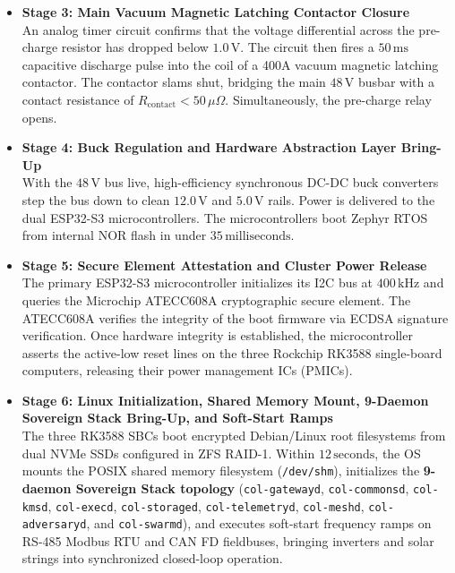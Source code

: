 \begin{itemize}
    \item \textbf{Stage 3: Main Vacuum Magnetic Latching Contactor Closure} \\
    An analog timer circuit confirms that the voltage differential across the pre-charge resistor has dropped below $1.0\,\mathrm{V}$. The circuit then fires a $50\,\mathrm{ms}$ capacitive discharge pulse into the coil of a 400A vacuum magnetic latching contactor. The contactor slams shut, bridging the main $48\,\mathrm{V}$ busbar with a contact resistance of $R_{\mathrm{contact}} < 50\,\mu\Omega$. Simultaneously, the pre-charge relay opens.
    
    \item \textbf{Stage 4: Buck Regulation and Hardware Abstraction Layer Bring-Up} \\
    With the $48\,\mathrm{V}$ bus live, high-efficiency synchronous DC-DC buck converters step the bus down to clean $12.0\,\mathrm{V}$ and $5.0\,\mathrm{V}$ rails. Power is delivered to the dual ESP32-S3 microcontrollers. The microcontrollers boot Zephyr RTOS from internal NOR flash in under $35\,\mathrm{milliseconds}$.
    
    \item \textbf{Stage 5: Secure Element Attestation and Cluster Power Release} \\
    The primary ESP32-S3 microcontroller initializes its I2C bus at $400\,\mathrm{kHz}$ and queries the Microchip ATECC608A cryptographic secure element. The ATECC608A verifies the integrity of the boot firmware via ECDSA signature verification. Once hardware integrity is established, the microcontroller asserts the active-low reset lines on the three Rockchip RK3588 single-board computers, releasing their power management ICs (PMICs).
    
    \item \textbf{Stage 6: Linux Initialization, Shared Memory Mount, 9-Daemon Sovereign Stack Bring-Up, and Soft-Start Ramps} \\
    The three RK3588 SBCs boot encrypted Debian/Linux root filesystems from dual NVMe SSDs configured in ZFS RAID-1. Within $12\,\mathrm{seconds}$, the OS mounts the POSIX shared memory filesystem (\texttt{/dev/shm}), initializes the \textbf{9-daemon Sovereign Stack topology} (\texttt{col-gatewayd}, \texttt{col-commonsd}, \texttt{col-kmsd}, \texttt{col-execd}, \texttt{col-storaged}, \texttt{col-telemetryd}, \texttt{col-meshd}, \texttt{col-adversaryd}, and \texttt{col-swarmd}), and executes soft-start frequency ramps on RS-485 Modbus RTU and CAN FD fieldbuses, bringing inverters and solar strings into synchronized closed-loop operation.
\end{itemize}

